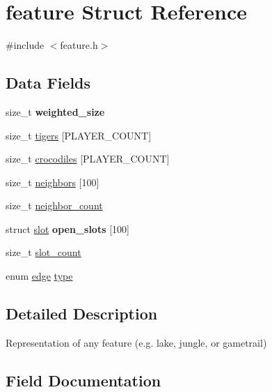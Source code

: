 \hypertarget{structfeature}{}\section{feature Struct Reference}
\label{structfeature}


{\ttfamily \#include $<$feature.\+h$>$}

\subsection*{Data Fields}
\begin{DoxyCompactItemize}
\item 
\hypertarget{structfeature_a328665c5ee8f686f58b4e20c1c463316}{}\label{structfeature_a328665c5ee8f686f58b4e20c1c463316} 
size\+\_\+t {\bfseries weighted\+\_\+size}
\item 
size\+\_\+t \hyperlink{structfeature_abd6f925fd40b726ddc078f75b30e8293}{tigers} \mbox{[}P\+L\+A\+Y\+E\+R\+\_\+\+C\+O\+U\+NT\mbox{]}
\item 
size\+\_\+t \hyperlink{structfeature_abc5d2874ef95d2e502eb4fb128115dcf}{crocodiles} \mbox{[}P\+L\+A\+Y\+E\+R\+\_\+\+C\+O\+U\+NT\mbox{]}
\item 
size\+\_\+t \hyperlink{structfeature_ad6c6e307f1420fd819b273c34dd3a0c5}{neighbors} \mbox{[}100\mbox{]}
\item 
size\+\_\+t \hyperlink{structfeature_ae67a31fdc2a52a5556442abed084e6b9}{neighbor\+\_\+count}
\item 
\hypertarget{structfeature_a56b7dfe5a93ee62c68f3cb88ea004de1}{}\label{structfeature_a56b7dfe5a93ee62c68f3cb88ea004de1} 
struct \hyperlink{structslot}{slot} {\bfseries open\+\_\+slots} \mbox{[}100\mbox{]}
\item 
size\+\_\+t \hyperlink{structfeature_a9e3d5a312665954040dbc946161deaef}{slot\+\_\+count}
\item 
enum \hyperlink{edge_8h_a4ef43ff5c6d42dacbc8ffd9c8cfdc189}{edge} \hyperlink{structfeature_a4d7c1f2b809931ecd2a6c56a4ab11a3f}{type}
\end{DoxyCompactItemize}


\subsection{Detailed Description}
Representation of any feature (e.\+g. lake, jungle, or gametrail) 

\subsection{Field Documentation}
\hypertarget{structfeature_abc5d2874ef95d2e502eb4fb128115dcf}{}\label{structfeature_abc5d2874ef95d2e502eb4fb128115dcf} 

